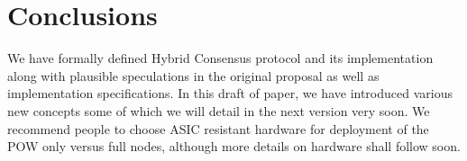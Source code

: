 \section{Conclusions}

We have formally defined Hybrid Consensus protocol and its implementation along with plausible speculations in the original
proposal as well as implementation specifications. In this draft of paper, we have introduced various new concepts
some of which we will detail in the next version very soon. We recommend people to choose ASIC resistant hardware for
deployment of the POW only versus full nodes, although more details on hardware shall follow soon. 
